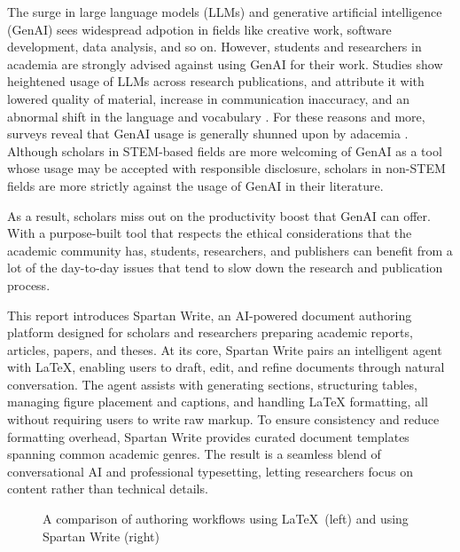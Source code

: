 The surge in large language models (LLMs) and generative artificial intelligence (GenAI) sees widespread adpotion in fields like creative work, software development, data analysis, and so on.
However, students and researchers in academia are strongly advised against using GenAI for their work.
Studies show heightened usage of LLMs across research publications, and attribute it with lowered quality of material, increase in communication inaccuracy, and an abnormal shift in the language and vocabulary \cite{kobak_delving_2025}.
For these reasons and more, surveys reveal that GenAI usage is generally shunned upon by adacemia \cite{kwon_survey_2025}.
Although scholars in STEM-based fields are more welcoming of GenAI as a tool whose usage may be accepted with responsible disclosure, scholars in non-STEM fields are more strictly against the usage of GenAI in their literature.

As a result, scholars miss out on the productivity boost that GenAI can offer.
With a purpose-built tool that respects the ethical considerations that the academic community has, students, researchers, and publishers can benefit from a lot of the day-to-day issues that tend to slow down the research and publication process.

This report introduces Spartan Write, an AI-powered document authoring platform designed for scholars and researchers preparing academic reports, articles, papers, and theses.
At its core, Spartan Write pairs an intelligent agent with \LaTeX, enabling users to draft, edit, and refine documents through natural conversation.
The agent assists with generating sections, structuring tables, managing figure placement and captions, and handling LaTeX formatting, all without requiring users to write raw markup.
To ensure consistency and reduce formatting overhead, Spartan Write provides curated document templates spanning common academic genres.
The result is a seamless blend of conversational AI and professional typesetting, letting researchers focus on content rather than technical details.

\begin{figure}[htbp]
    \centering
    
    \caption{A comparison of authoring workflows using \LaTeX\ (left) and using Spartan Write (right)}
    \label{fig:authoring-workflow}
\end{figure}
